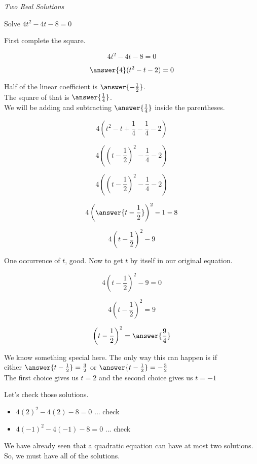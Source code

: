 \documentclass{ximera}
\begin{document}
\begin{example} \textit{Two Real Solutions}

Solve $4  t^2 - 4 t - 8 = 0$ \\


\begin{explanation}

First complete the square.



\[ 4 t^2 -  4 t - 8 = 0 \]

\[ \answer{4} (t^2 - t - 2) = 0 \]



Half of the linear coefficient is $\answer{-\frac{1}{2}}$. \\

The square of that is $\answer{\frac{1}{4}}$. \\

We will be adding and subtracting $\answer{\frac{1}{4}}$ inside the parentheses.




\[ 4 (t^2 - t + \frac{1}{4} - \frac{1}{4} - 2)  \]


\[ 4 \left(\left(t - \frac{1}{2}\right)^2 - \frac{1}{4} - 2\right)  \]


\[ 4 \left(\left(t - \frac{1}{2}\right)^2 - \frac{1}{4} - 2\right)  \]

\[ 4 \left( \answer{t - \frac{1}{2}} \right)^2 - 1 - 8  \]

\[ 4 \left(t - \frac{1}{2}\right)^2 - 9  \]


One occurrence of $t$, good. Now to get $t$ by itself in our original equation.

\[ 4 \left(t - \frac{1}{2}\right)^2 - 9 = 0  \]

\[ 4 \left(t - \frac{1}{2}\right)^2 = 9  \]

\[  \left(t - \frac{1}{2}\right)^2 = \answer{\frac{9}{4}}  \]

We know something special here. The only way this can happen is if \\



either   $\answer{t - \frac{1}{2}} = \frac{3}{2}$  or  $\answer{t - \frac{1}{2}} = -\frac{3}{2}$ \\

The first choice gives us $t = 2$ and the second choice gives us $t = -1$




Let's check those solutions.

\begin{itemize}
\item $4 (2)^2 - 4 (2) - 8 = 0$ ... check
\item $4 (-1)^2 - 4 (-1) - 8 = 0$ ... check
\end{itemize}



We have already seen that a quadratic equation can have at most two solutions.  So, we must have all of the solutions.

\end{explanation}


\end{example}
\end{document}
